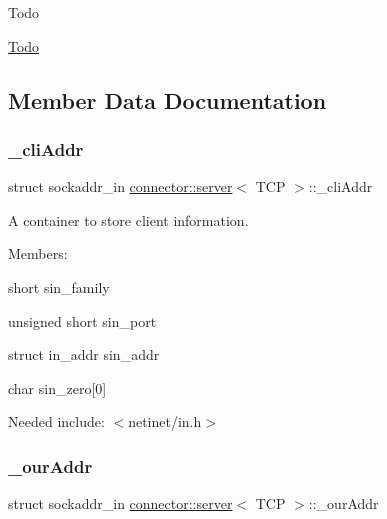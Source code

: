\begin{DoxyRefDesc}{Todo}
\item[\hyperlink{todo__todo000012}{Todo}]\end{DoxyRefDesc}


\subsection{Member Data Documentation}
\mbox{\label{classconnector_1_1server_3_01TCP_01_4_ad7dec6f05836574233c7db145fbd4efc}} 
\subsubsection{\texorpdfstring{\+\_\+cli\+Addr}{\_cliAddr}}
{\footnotesize\ttfamily struct sockaddr\+\_\+in \hyperlink{classconnector_1_1server}{connector\+::server}$<$ T\+CP $>$\+::\+\_\+cli\+Addr\hspace{0.3cm}{\ttfamily [private]}}



A container to store client information. 

Members\+:
\begin{DoxyItemize}
\item {\ttfamily short} sin\+\_\+family
\item {\ttfamily unsigned short} sin\+\_\+port
\item {\ttfamily struct} in\+\_\+addr sin\+\_\+addr
\item {\ttfamily char} sin\+\_\+zero\mbox{[}0\mbox{]}
\end{DoxyItemize}

Needed include\+: {\ttfamily $<$netinet/in.\+h$>$} \mbox{\label{classconnector_1_1server_3_01TCP_01_4_aa75f95157f5a38c9ba65625b0ee7bddc}} 
\subsubsection{\texorpdfstring{\+\_\+our\+Addr}{\_ourAddr}}
{\footnotesize\ttfamily struct sockaddr\+\_\+in \hyperlink{classconnector_1_1server}{connector\+::server}$<$ T\+CP $>$\+::\+\_\+our\+Addr\hspace{0.3cm}{\ttfamily [private]}}



